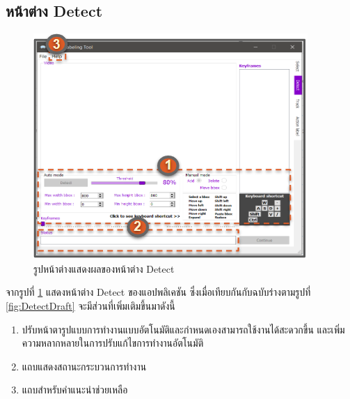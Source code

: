 \subsection*{หน้าต่าง Detect}
\begin{figure}[!ht]
  \centering
    \includegraphics[scale=1.2]{chapter4/images/New_Final_ui/Detect.png}
    \caption{รูปหน้าต่างแสดงผลของหน้าต่าง Detect}
    \label{fig:final_detect}
\end{figure}
จากรูปที่ \ref{fig:final_detect} แสดงหน้าต่าง Detect ของแอปพลิเคชัน ซึ่งเมื่อเทียบกันกับฉบับร่างตามรูปที่ \ref{fig:DetectDraft} จะมีส่วนที่เพิ่มเติมขึ้นมาดังนี้
\begin{enumerate}
	\item ปรับหน้าตารูปแบบการทำงานแบบอัตโนมัติและกำหนดเองสามารถใช้งานได้สะดวกขึ้น และเพิ่มความหลากหลายในการปรับแก้ไขการทำงานอัตโนมัติ
	\item แถบแสดงสถานะกระบวนการทำงาน
	\item แถบสำหรับคำแนะนำช่วยเหลือ
\end{enumerate}		

\clearpage
